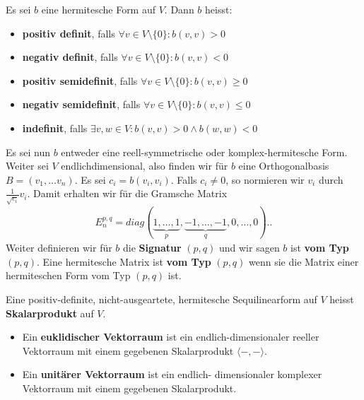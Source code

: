 \documentclass[../Algebra_script.tex]{subfiles}
\begin{document}
    \begin{definition}
        Es sei $b$ eine hermitesche Form auf $V$. Dann $b$ heisst:
        \begin{itemize}
            \item \textbf{positiv definit}, falls $\forall v \in V\setminus\{0\}: b(v,v) > 0$
            \item \textbf{negativ definit}, falls $\forall v \in V \setminus \{0\}: b(v,v) < 0$
            \item \textbf{positiv semidefinit}, falls $\forall v \in V \setminus \{0\}: b(v,v) \ge 0$
            \item \textbf{negativ semidefinit}, falls $\forall v \in V \setminus \{0\}: b(v, v) \le 0$ 
            \item \textbf{indefinit}, falls $\exists v, w \in V: b(v,v) > 0 \wedge b(w,w) <0$
        \end{itemize}
    \end{definition}

    \begin{definition}[Signatur]
        Es sei nun $b$ entweder eine reell-symmetrische oder komplex-hermitesche Form. Weiter sei $V$ endlichdimensional, also finden wir für $b$ eine
        Orthogonalbasis $B = (v_1, \ldots v_{n})$. Es sei $c_{i} = b(v_{i}, v_{i})$. Falls $c_{i} \neq 0$, so normieren wir $v_{i}$ durch
        $\frac{1}{\sqrt{c_{i}}}v_{i}$. Damit erhalten wir für die Gramsche Matrix 
        \begin{align*}
            E_{n}^{p,q} = diag(\underbrace{1, \ldots, 1}_{p}, \underbrace{-1, \ldots, -1}_{q}, 0, \ldots, 0).
        .\end{align*}
        Weiter definieren wir für $b$ die \textbf{Signatur} $(p, q)$ und wir sagen $b$ ist \textbf{vom Typ} $(p, q)$. Eine hermitesche Matrix ist \textbf{vom
        Typ} $(p, q)$ wenn sie die Matrix einer hermiteschen Form vom Typ $(p, q)$ ist.
    \end{definition}

    \begin{definition}[Skalarprodukt]
        Eine positiv-definite, nicht-ausgeartete, hermitesche Sequilinearform auf $V$ heisst \textbf{Skalarprodukt} auf $V$.
        \begin{itemize}
            \item Ein \textbf{euklidischer Vektorraum} ist ein endlich-dimensionaler reeller Vektorraum mit einem gegebenen Skalarprodukt $\langle -,
                - \rangle$.
            \item Ein \textbf{unitärer Vektorraum} ist ein endlich- dimensionaler komplexer Vektorraum mit einem gegebenen Skalarprodukt.
        \end{itemize}
    \end{definition}
\end{document}
